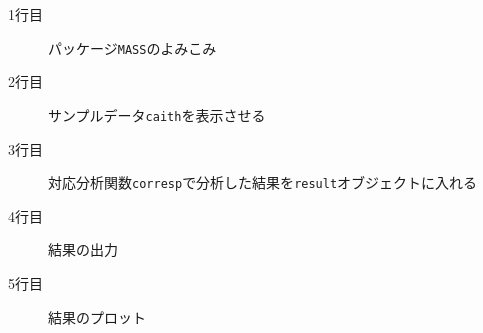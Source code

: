 \begin{description}
	\item[1行目] パッケージ\texttt{MASS}のよみこみ
	\item[2行目] サンプルデータ\texttt{caith}を表示させる
	\item[3行目] 対応分析関数\texttt{corresp}で分析した結果を\texttt{result}オブジェクトに入れる
	\item[4行目] 結果の出力
	\item[5行目] 結果のプロット
\end{description}
